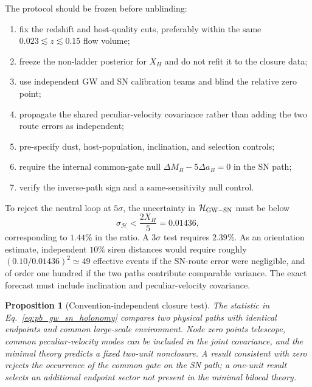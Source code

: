 \documentclass[aps,prd,twocolumn,10pt,superscriptaddress,nofootinbib]{revtex4-2}
\newtheorem{proposition}{Proposition}
\begin{document}
The protocol should be frozen before unblinding:
\begin{enumerate}
\item fix the redshift and host-quality cuts, preferably within the same
$0.023\lesssim z\lesssim0.15$ flow volume;
\item freeze the non-ladder posterior for $X_H$ and do not refit it to the
closure data;
\item use independent GW and SN calibration teams and blind the relative
zero point;
\item propagate the shared peculiar-velocity covariance rather than adding
the two route errors as independent;
\item pre-specify dust, host-population, inclination, and selection controls;
\item require the internal common-gate null
$\Delta M_B-5\Delta a_B=0$ in the SN path;
\item verify the inverse-path sign and a same-sensitivity null control.
\end{enumerate}
To reject the neutral loop at $5\sigma$, the uncertainty in
$\mathcal H_{\rm GW-SN}$ must be below
\begin{equation}
 \sigma_{\mathcal H}<\frac{2X_H}{5}=0.01436,
 \label{eq:pb_closure_precision}
\end{equation}
corresponding to $1.44\%$ in the ratio.  A $3\sigma$ test requires $2.39\%$.
As an orientation estimate, independent $10\%$ siren distances would require
roughly $(0.10/0.01436)^2\simeq49$ effective events if the SN-route error
were negligible, and of order one hundred if the two paths contribute
comparable variance.  The exact forecast must include inclination and
peculiar-velocity covariance.

\begin{proposition}[Convention-independent closure test]
The statistic in Eq.~\eqref{eq:pb_gw_sn_holonomy} compares two physical
paths with identical endpoints and common large-scale environment.  Node
zero points telescope, common peculiar-velocity modes can be included in the
joint covariance, and the minimal theory predicts a fixed two-unit
nonclosure.  A result consistent with zero rejects the occurrence of the
common gate on the SN path; a one-unit result selects an additional endpoint
sector not present in the minimal bilocal theory.
\end{proposition}



\end{document}
